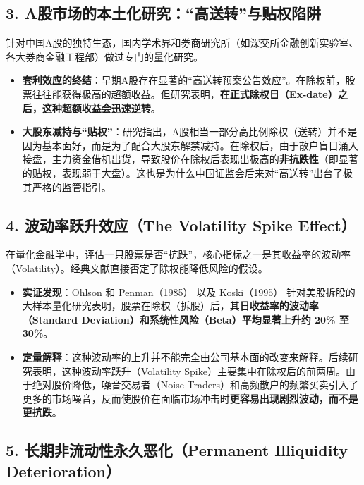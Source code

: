 \documentclass[a4paper,10pt]{article}
\begin{document}
\subsection{3. A股市场的本土化研究：“高送转”与贴权陷阱}

针对中国A股的独特生态，国内学术界和券商研究所（如深交所金融创新实验室\cite{SZSE_HighDividend}、各大券商金融工程部）做过专门的量化研究。

\begin{itemize}
    \item \textbf{套利效应的终结}：早期A股存在显著的“高送转预案公告效应”。在除权前，股票往往能获得极高的超额收益。但研究表明，\textbf{在正式除权日（Ex-date）之后，这种超额收益会迅速逆转}。
    \item \textbf{大股东减持与“贴权”}：研究指出，A股相当一部分高比例除权（送转）并不是因为基本面好，而是为了配合大股东解禁减持。在除权后，由于散户盲目涌入接盘，主力资金借机出货，导致股价在除权后表现出极高的\textbf{非抗跌性}（即显著的贴权，表现弱于大盘）。这也是为什么中国证监会后来对“高送转”出台了极其严格的监管指引。
\end{itemize}

\subsection{4. 波动率跃升效应（The Volatility Spike Effect）}

在量化金融学中，评估一只股票是否“抗跌”，核心指标之一是其收益率的波动率（Volatility）。经典文献直接否定了除权能降低风险的假设。

\begin{itemize}
    \item \textbf{实证发现}：Ohlson 和 Penman（1985）\cite{OhlsonPenman1985} 以及 Koski（1995）\cite{Koski1995} 针对美股拆股的大样本量化研究表明，股票在除权（拆股）后，其\textbf{日收益率的波动率（Standard Deviation）和系统性风险（Beta）平均显著上升约 20\% 至 30\%}。
    \item \textbf{定量解释}：这种波动率的上升并不能完全由公司基本面的改变来解释。后续研究表明，这种波动率跃升（Volatility Spike）主要集中在除权后的前两周。由于绝对股价降低，噪音交易者（Noise Traders）和高频散户的频繁买卖引入了更多的市场噪音，反而使股价在面临市场冲击时\textbf{更容易出现剧烈波动，而不是更抗跌}。
\end{itemize}

\subsection{5. 长期非流动性永久恶化（Permanent Illiquidity Deterioration）}
\end{document}
